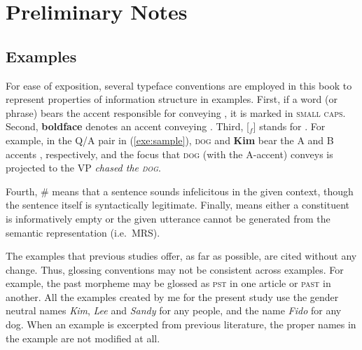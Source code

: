 \chapter{Preliminary Notes}
\label{2:notes}
\setcounter{enums}{0}



\section{Examples}
\label{1:sec:examples}


For ease of exposition, several typeface conventions are employed in
this book to represent properties of information structure in
examples. First, if a word (or phrase) bears the accent responsible
for conveying , it is marked in \textsc{small caps}. Second,
\textbf{boldface} denotes an accent conveying .  Third, [$_{f}$]
stands for . For example, in the  Q/A pair in
(\ref{exe:sample}), \textsc{dog} and \textbf{Kim} bear the A and B
accents \citep{jackendoff:72}, respectively, and the focus that
\textsc{dog} (with the A-accent) conveys is projected to the VP
\textit{chased the \textsc{dog}}.


\noindent Fourth, \# means that a sentence sounds infelicitous in the
given context, though the sentence itself is syntactically
legitimate. Finally,  means either a constituent is
informatively empty or the given utterance cannot be generated from
the semantic representation (i.e.\ MRS).


The examples that previous studies offer, as far as possible, are
cited without any change. Thus, glossing conventions may not be
consistent across examples. For example, the past morpheme may be
glossed as \textsc{pst} in one article or \textsc{past} in another.
All the examples created by me for the present study use the gender
neutral names \textit{Kim}, \textit{Lee} and \textit{Sandy} for any
people, and the name \textit{Fido} for any dog.  When an example is
excerpted from previous literature, the proper names in the example
are not modified at all.



